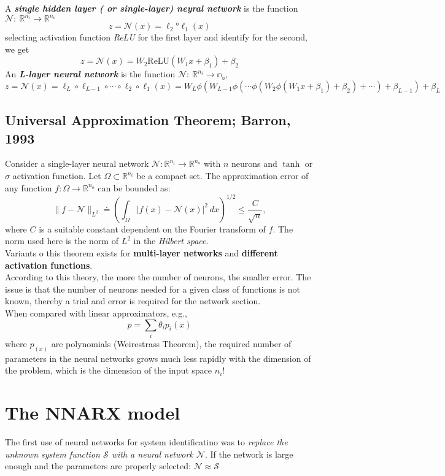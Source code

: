 A\textbf{ \textit{single hidden layer ( or single-layer) neyral network} }is the function $\mathcal{N}:\:\mathbb{R}^{n_i} \rightarrow \mathbb{R}^{n_o}$
\[
z = \mathcal{N}(x) = \ell_2 ° \ell_1(x)
\]
selecting activation function \textit{ReLU} for the first layer and identify for the second, we get
\[
z = \mathcal{N}(x) = W_2 \text{ReLU}(W_1x + \beta_1) + \beta_2
\]
An \textit{\textbf{L-layer neural network}} is the function $\mathcal{N}:\: \mathbb{R}^{n_i} \rightarrow \mathbb{n_o}$,
\[
z = \mathcal{N}(x) = \ell_L \circ \ell_{L-1} \circ \cdots \circ \ell_2 \circ \ell_1(x) 
= W_L\phi(W_{L-1}\phi(\cdots \phi(W_2\phi(W_1x + \beta_1) + \beta_2) + \cdots) + \beta_{L-1}) + \beta_L
\]

\subsection{Universal Approximation Theorem; Barron, 1993}
Consider a single-layer neural network $\mathcal{N} : \mathbb{R}^{n_i} \to \mathbb{R}^{n_o}$ with $n$ neurons and $\tanh$ or $\sigma$ activation function. Let $\Omega \subset \mathbb{R}^{n_i}$ be a compact set. The approximation error of any function $f : \Omega \to \mathbb{R}^{n_o}$ can be bounded as:
\[
\|f - \mathcal{N}\|_{L^2} \doteq \left( \int_{\Omega} |f(x) - \mathcal{N}(x)|^2 \, dx \right)^{1/2} \leq \frac{C}{\sqrt{n}},
\]
where $C$ is a suitable constant dependent on the Fourier transform of $f$. The norm used here is the norm of $L^2$ in the \textit{Hilbert space}.\\

Variants o this theorem exists for \textbf{multi-layer networks} and \textbf{different activation functions}.\\

According to this theory, the more the number of neurons, the smaller error. The issue is that the number of neurons needed for a given class of functions is not known, thereby a trial and error is required for the network section.\\

When compared with linear approximators, e.g.,
\[
p = \sum\limits_{i} \theta_i p_i(x)
\]
where $p_(x)$ are polynomials (Weirestrass Theorem), the required number of parameters in the neural networks grows much less rapidly with the dimension of the problem, which is the dimension of the input space $n_i$!\\

\section{The NNARX model}
The first use of neural networks for system identificatino was to \textit{replace the unknown system function $\mathcal{S}$ with a neural network $\mathcal{N}$}. If the network is large enough and the parameters are properly selected: $\mathcal{N} \approx\mathcal{S}$

